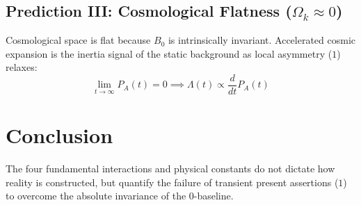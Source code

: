 \documentclass[11pt,a4paper]{article}
\begin{document}
\subsection{Prediction III: Cosmological Flatness (\texorpdfstring{$\Omega_k \approx 0$}{Omega\_k approx 0})}
Cosmological space is flat because $B_0$ is intrinsically invariant. Accelerated cosmic expansion is the inertia signal of the static background as local asymmetry ($1$) relaxes:
\begin{equation}
\lim_{t \to \infty} P_A(t) = 0 \implies \Lambda(t) \propto \frac{d}{dt} P_A(t)
\end{equation}

\section{Conclusion}
The four fundamental interactions and physical constants do not dictate how reality is constructed, but quantify the failure of transient present assertions ($1$) to overcome the absolute invariance of the $0$-baseline.



\end{document}
